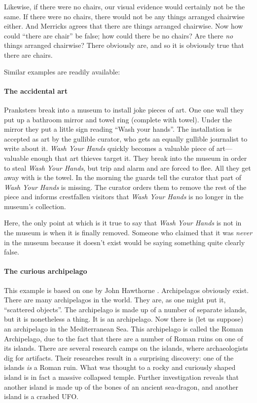 \documentclass[11pt]{article}
\begin{document}
\begin{spacing}{1.25}
Likewise, if there were no chairs, our visual evidence would certainly
not be the same.  If there were no chairs, there would not be any
things arranged chairwise either.  And Merricks agrees that there are
things arranged chairwise.  Now how could ``there are chair'' be
false; how could there be no chairs?  Are there {\em no} things
arranged chairwise?  There obviously are, and so it is obviously true
that there are chairs.

Similar examples are readily available:

\paragraph{The accidental art} \label{towel}
Pranksters break into a museum to install joke pieces of art.  One one
wall they put up a bathroom mirror and towel ring (complete with
towel).  Under the mirror they put a little sign reading ``Wash your
hands''.  The installation is accepted as art by the gullible curator,
who gets an equally gullible journalist to write about it.  {\em Wash
  Your Hands} quickly becomes a valuable piece of art---valuable
enough that art thieves target it.  They break into the museum in
order to steal {\em Wash Your Hands}, but trip and alarm and are
forced to flee.  All they get away with is the towel.  In the morning
the guards tell the curator that part of {\em Wash Your Hands} is
missing.  The curator orders them to remove the rest of the piece and
informs crestfallen visitors that {\em Wash Your Hands} is no longer
in the museum's collection.

Here, the only point at which is it true to say that {\em Wash Your
  Hands} is not in the museum is when it is finally removed.  Someone
who claimed that it was {\em never} in the museum because it doesn't
exist would be saying something quite clearly false.

\paragraph{The curious archipelago} \label{roman}
This example is based on one by John Hawthorne
\citeyearpar{hawthorne2008}.  Archipelagos obviously exist.  There are
many archipelagos in the world.  They are, as one might put it,
``scattered objects''.  The archipelago is made up of a number of
separate islands, but it is nonetheless a thing.  It is an
archipelago.  Now there is (let us suppose) an archipelago in the
Mediterranean Sea.  This archipelago is called the Roman Archipelago,
due to the fact that there are a number of Roman ruins on one of its
islands.  There are several research camps on the islands, where
archaeologists dig for artifacts.  Their researches result in a
surprising discovery: one of the islands {\em is} a Roman ruin.  What
was thought to a rocky and curiously shaped island is in fact a
massive collapsed temple.  Further investigation reveals that another
island is made up of the bones of an ancient sea-dragon, and another
island is a crashed UFO.


\end{spacing}
\end{document}
